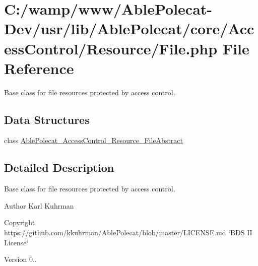 \hypertarget{_file_8php}{}\section{C\+:/wamp/www/\+Able\+Polecat-\/\+Dev/usr/lib/\+Able\+Polecat/core/\+Access\+Control/\+Resource/\+File.php File Reference}
\label{_file_8php}


Base class for file resources protected by access control.  


\subsection*{Data Structures}
\begin{DoxyCompactItemize}
\item 
class \hyperlink{class_able_polecat___access_control___resource___file_abstract}{Able\+Polecat\+\_\+\+Access\+Control\+\_\+\+Resource\+\_\+\+File\+Abstract}
\end{DoxyCompactItemize}


\subsection{Detailed Description}
Base class for file resources protected by access control. 

\begin{DoxyAuthor}{Author}
Karl Kuhrman 
\end{DoxyAuthor}
\begin{DoxyCopyright}{Copyright}
https\+://github.com/kkuhrman/\+Able\+Polecat/blob/master/\+L\+I\+C\+E\+N\+S\+E.\+md \char`\"{}\+B\+D\+S I\+I License\char`\"{} 
\end{DoxyCopyright}
\begin{DoxyVersion}{Version}
0.. 
\end{DoxyVersion}
